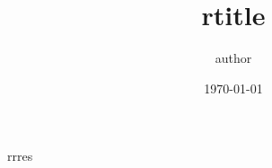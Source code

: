 \documentclass{article}
\title{ {{rtitle}} }
\author{ {{author}} }
\date{\today}
\begin{document}
\maketitle
\clearpage
\listoftables
\newpage
\listoffigures
\newpage
{{{rrres}}}
\end{document}
